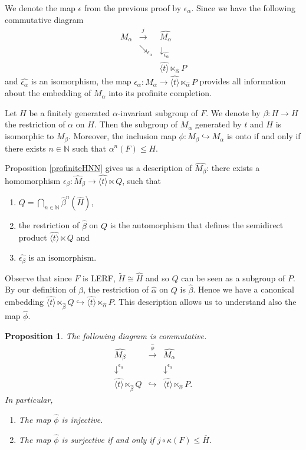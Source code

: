 \documentclass{amsart}
\newtheorem{pro}[lem]{Proposition}
\theoremstyle{definition}
\theoremstyle{remark}
\newcommand{\N}{\mathbb{N}}
\begin{document}
We  denote the map $\epsilon$ from the previous proof by $\epsilon_\alpha$. Since we have the following commutative diagram
$$\begin{array}{ccc}
M_\alpha & \xrightarrow {j} &\widehat{M_\alpha}\\
&\searrow_{\epsilon_\alpha}&\downarrow_{\widehat{\epsilon_\alpha}}\\
&& \widehat {\langle t\rangle}\ltimes_{\widehat \alpha} P\end{array}$$
and $\widehat{\epsilon_\alpha}$ is an isomorphism, the map $\epsilon_\alpha:M_\alpha\to  \widehat {\langle t\rangle}\ltimes_{\widehat \alpha} P$ provides all information about the embedding of $M_\alpha$ into its profinite completion.

Let $H$ be a finitely generated $\alpha$-invariant subgroup of $F$. We denote by $\beta:H\to H$ the restriction of $\alpha$ on $H$. Then the subgroup of $M_\alpha$ generated by $t$ and $H$ is isomorphic to $M_\beta$. Moreover, the inclusion map $\phi:M_\beta \hookrightarrow M_\alpha$  is onto if and only if there exists $n\in\N$ such that $\alpha^n(F)\le H$.

 Proposition \ref{profiniteHNN} gives us a description of $\widehat{M_\beta}$: there exists a homomorphism  $\epsilon_\beta:\widehat M_\beta\to \widehat {\langle t\rangle}\ltimes Q$, such that  
\begin{enumerate}
\item  $Q=\displaystyle \bigcap_{n\in \N} \widehat \beta^n(\widehat H)$,
\item the restriction of $\widehat \beta$ on $Q$ is the automorphism that defines the semidirect product  $\widehat {\langle t\rangle}\ltimes Q$ and
\item $\widehat{\epsilon_\beta}$ is an isomorphism.
\end{enumerate}
Observe that since $F$ is LERF, $\widetilde H\cong \widehat H$ and so $Q$   can be seen as a subgroup of $P$. By our definition of $\beta$, the restriction of $\widehat \alpha$ on $Q$ is $\widehat \beta$. Hence we have a canonical embedding
$\widehat {\langle t\rangle}\ltimes_{\widehat \beta} Q  \hookrightarrow  \widehat {\langle t\rangle}\ltimes_{\widehat \alpha} P$.
This description allows us to understand also the map $\widehat \phi$.
\begin{pro}\label{subgroupHNN}
The following diagram is commutative.
$$\begin{array}{ccc}
\widehat{M_\beta} & \xrightarrow{\widehat \phi}& \widehat{M_\alpha}\\
\downarrow^{\epsilon_\alpha}&&\downarrow^{\epsilon_\alpha}\\
\widehat {\langle t\rangle}\ltimes_{\widehat \beta} Q& \hookrightarrow & \widehat {\langle t\rangle}\ltimes_{\widehat \alpha} P.
\end{array}$$
In particular,
\begin{enumerate}
\item The map $\widehat \phi$ is injective.
\item  The map $\widehat \phi$ is surjective if and only if $j\circ \kappa(F)\le \overline H$.
\end{enumerate}
 \end{pro}
\end{document}
